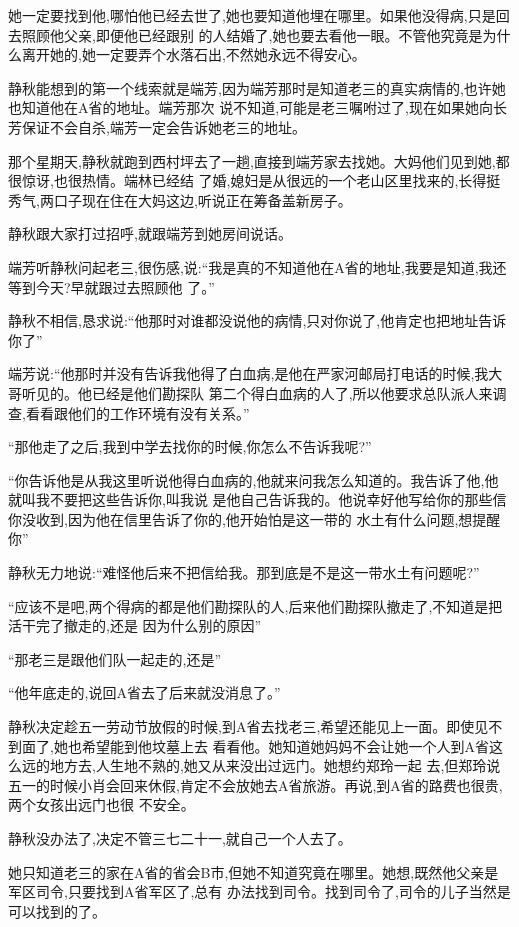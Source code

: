 ﻿\documentclass[12pt]{article}
\begin{document}
她一定要找到他,哪怕他已经去世了,她也要知道他埋在哪里。如果他没得病,只是回去照顾他父亲,即便他已经跟别
的人结婚了,她也要去看他一眼。不管他究竟是为什么离开她的,她一定要弄个水落石出,不然她永远不得安心。

静秋能想到的第一个线索就是端芳,因为端芳那时是知道老三的真实病情的,也许她也知道他在A省的地址。端芳那次
说不知道,可能是老三嘱咐过了,现在如果她向长芳保证不会自杀,端芳一定会告诉她老三的地址。

那个星期天,静秋就跑到西村坪去了一趟,直接到端芳家去找她。大妈他们见到她,都很惊讶,也很热情。端林已经结
了婚,媳妇是从很远的一个老山区里找来的,长得挺秀气,两口子现在住在大妈这边,听说正在筹备盖新房子。

静秋跟大家打过招呼,就跟端芳到她房间说话。

端芳听静秋问起老三,很伤感,说:``我是真的不知道他在A省的地址,我要是知道,我还等到今天?早就跟过去照顾他
了。''

静秋不相信,恳求说:``他那时对谁都没说他的病情,只对你说了,他肯定也把地址告诉你了\myrule ''

端芳说:``他那时并没有告诉我他得了白血病,是他在严家河邮局打电话的时候,我大哥听见的。他已经是他们勘探队
第二个得白血病的人了,所以他要求总队派人来调查,看看跟他们的工作环境有没有关系。''

``那\myrule 他走了之后,我到中学去找你的时候,你怎么不告诉\myrule 我呢?''

``你告诉他是从我这里听说他得白血病的,他就来问我怎么知道的。我告诉了他,他就叫我不要把这些告诉你,叫我说
是他自己告诉我的\myrule 。他说幸好他写给你的那些信你没收到,因为他在信里告诉了你的,他开始怕是这一带的
水土有什么问题,想提醒你\myrule ''

静秋无力地说:``难怪他后来不把信给我。那到底是不是这一带水土有问题呢?''

``应该不是吧,两个得病的都是他们勘探队的人,后来他们勘探队撤走了\myrule ,不知道是把活干完了撤走的,还是
因为什么别的原因\myrule ''

``那\myrule 老三是跟他们队一起走的,还是\myrule ''

``他年底走的,说回A省去了\myrule 后来就没消息了。''

静秋决定趁五一劳动节放假的时候,到A省去找老三,希望还能见上一面。即使见不到面了,她也希望能到他坟墓上去
看看他。她知道她妈妈不会让她一个人到A省这么远的地方去,人生地不熟的,她又从来没出过远门。她想约郑玲一起
去,但郑玲说五一的时候小肖会回来休假,肯定不会放她去A省旅游。再说,到A省的路费也很贵,两个女孩出远门也很
不安全。

静秋没办法了,决定不管三七二十一,就自己一个人去了。

她只知道老三的家在A省的省会B市,但她不知道究竟在哪里。她想,既然他父亲是军区司令,只要找到A省军区了,总有
办法找到司令。找到司令了,司令的儿子当然是可以找到的了。
\end{document}
